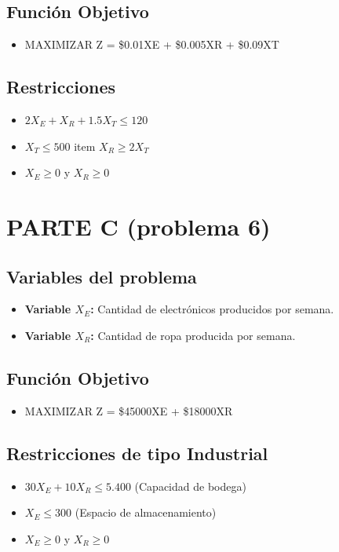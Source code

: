 \documentclass{article}
\begin{document}
\subsection*{Función Objetivo}
\begin{itemize}
    \item MAXIMIZAR Z = \$0.01XE + \$0.005XR + \$0.09XT
\end{itemize}

\subsection*{Restricciones}
\begin{itemize}
    \item $2X_E + X_R + 1.5X_T \leq 120$ 
    \item $X_T \leq 500$ 
    item $X_R \geq 2X_T$ 
    \item $X_E \geq 0$ y $X_R \geq 0$ 
\end{itemize}







\vspace{12cm}
\section*{PARTE C (problema 6)}


\subsection*{Variables del problema}
\begin{itemize}
    \item \textbf{Variable $X_E$:} Cantidad de electrónicos producidos por semana.
    \item \textbf{Variable $X_R$:} Cantidad de ropa producida por semana.
\end{itemize}

\subsection*{Función Objetivo}
\begin{itemize}
    \item MAXIMIZAR Z = \$45000XE + \$18000XR
\end{itemize}

\subsection*{Restricciones de tipo Industrial}
\begin{itemize}
    \item $30X_E + 10X_R \leq 5.400$ (Capacidad de bodega)
    \item $X_E \leq 300$ (Espacio de almacenamiento)
    \item $X_E \geq 0$ y $X_R \geq 0$ 
\end{itemize}
\end{document}
